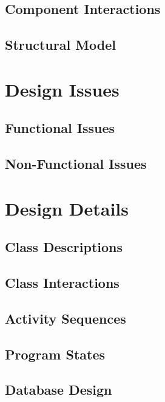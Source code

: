 \documentclass[12pt]{article}
\begin{document}
\subsection{Component Interactions}

\subsection{Structural Model}




\section{Design Issues}

\subsection{Functional Issues}

\subsection{Non-Functional Issues}




\section{Design Details}

\subsection{Class Descriptions}

\subsection{Class Interactions}

\subsection{Activity Sequences}

\subsection{Program States}

\subsection{Database Design}
\end{document}
